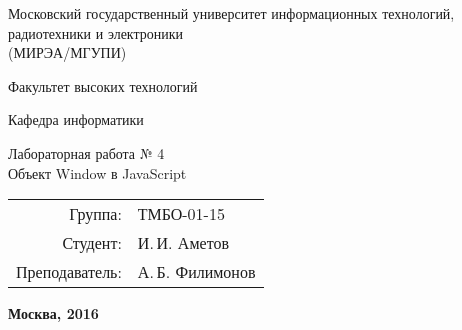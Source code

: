 \begin{titlepage}
\begin{center} %

\bfseries

	{\Large Московский государственный университет информационных технологий, радиотехники и электроники \\
	(МИРЭА/МГУПИ)
	
	} %

\vspace{48pt}


	{\large 
	  Факультет высоких технологий
	}


\vspace{36pt}


	{\large  {\comic Кафедра информатики}
	
	} %

\vspace{48pt}

{\large	\DoloresCyr Лабораторная работа № 4 \\
  \LARGE{Объект Window в JavaScript}
	
	}

\vspace{12pt}


\end{center} %

\vspace{60pt}

	\begin{flushright}
	  \begin{tabular}{rl}
            Группа: & ТМБО-01-15\\
			Студент: & И.\,И. Аметов \\
			Преподаватель: & А.\,Б. Филимонов \\
		\end{tabular}
	\end{flushright}

\vfill

	\begin{center} %
		\bfseries
		Москва, 2016
	\end{center}
	
\end{titlepage} 


